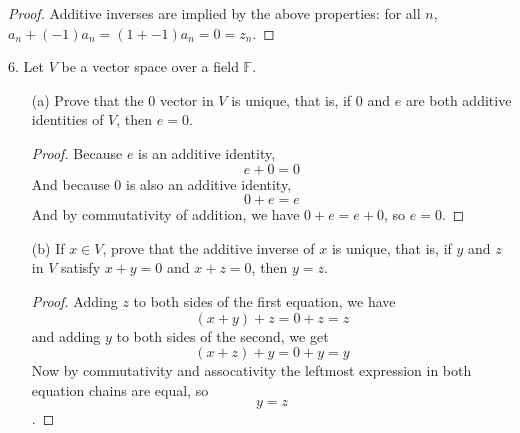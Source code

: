 \documentclass[12pt]{article} %
\newcommand{\F}{\mathbb{F}}
\begin{document}
\begin{flushleft}
\begin{proof}
  Additive inverses are implied by the above properties: for all $n$, $a_n + (-1)a_n = (1 + -1)a_n = 0 = z_n$.
\end{proof}

\newpage%
 
6.  Let $V$ be a vector space over a field $\F$.
\begin{itemize}
 \item[(a)] Prove that the $0$ vector in $V$ is unique, that is, if $0$ and $e$ are both additive identities of $V$, then $e = 0$.

  \begin{proof}
    Because $e$ is an additive identity,
    $$e + 0 = 0$$
    And because $0$ is also an additive identity,
    $$0 + e = e$$
    And by commutativity of addition, we have $0+e = e+0$, so $e = 0$.
  \end{proof}



 \item[(b)] If $x \in V$, prove that the additive inverse of $x$ is unique, that is, if $y$ and $z$ in $V$ satisfy $x + y = 0$ and $x + z = 0$, then $y = z$.

 \begin{proof}
    Adding $z$ to both sides of the first equation, we have
    $$(x+y) + z = 0 + z = z$$
    and adding $y$ to both sides of the second, we get
    $$(x+z) + y = 0 + y = y$$
    Now by commutativity and assocativity the leftmost expression in both equation chains are equal, so 
    $$y = z$$.
 \end{proof}
\end{itemize}


 
\end{flushleft}
\end{document}
